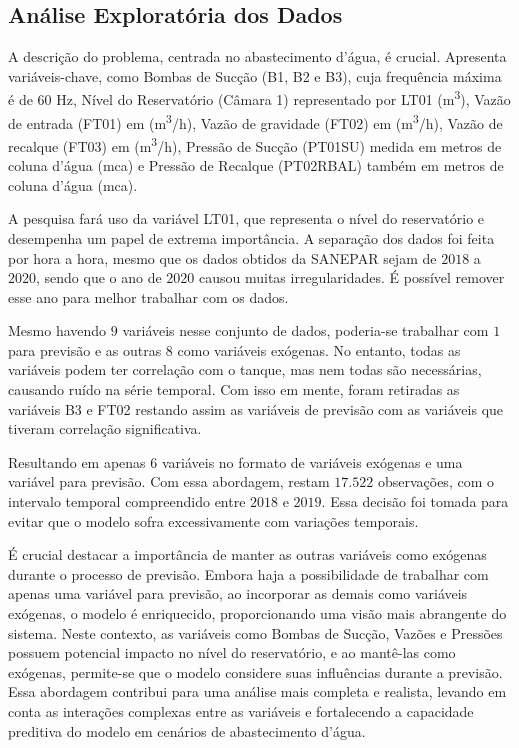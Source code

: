 \subsection{An\'alise Explorat\'oria dos Dados}


A descrição do problema, centrada no abastecimento d'água, é crucial. Apresenta variáveis-chave, como Bombas de Sucção (B1, B2 e B3), cuja frequência máxima é de $60$ Hz, Nível do Reservatório (Câmara 1) representado por LT01 (\si{m^3}), Vazão de entrada (FT01) em (\si{m^3/h}), Vazão de gravidade (FT02) em (\si{m^3/h}), Vazão de recalque (FT03) em (\si{m^3/h}), Pressão de Sucção (PT01SU) medida em metros de coluna d'água (\si{mca}) e Pressão de Recalque (PT02RBAL) também em metros de coluna d'água (\si{mca}).

A pesquisa fará uso da variável LT01, que representa o nível do reservatório e desempenha um papel de extrema importância. A separação dos dados foi feita por hora a hora, mesmo que os dados obtidos da SANEPAR sejam de $2018$ a $2020$, sendo que o ano de $2020$ causou muitas irregularidades. É possível remover esse ano para melhor trabalhar com os dados.

Mesmo havendo $9$ variáveis nesse conjunto de dados, poderia-se trabalhar com $1$ para previsão e as outras 8 como variáveis exógenas. No entanto, todas as variáveis podem ter correlação com o tanque, mas nem todas são necessárias, causando ruído na série temporal. Com isso em mente, foram retiradas as variáveis B3 e FT02 restando assim as variáveis de previsão com as variáveis que tiveram correlação significativa.

Resultando em apenas 6 variáveis no formato de variáveis exógenas e uma variável para previsão. Com essa abordagem, restam $17.522$ observações, com o intervalo temporal compreendido entre $2018$ e $2019$. Essa decisão foi tomada para evitar que o modelo sofra excessivamente com variações temporais.

É crucial destacar a importância de manter as outras variáveis como exógenas durante o processo de previsão. Embora haja a possibilidade de trabalhar com apenas uma variável para previsão, ao incorporar as demais como variáveis exógenas, o modelo é enriquecido, proporcionando uma visão mais abrangente do sistema. Neste contexto, as variáveis como Bombas de Sucção, Vazões e Pressões possuem potencial impacto no nível do reservatório, e ao mantê-las como exógenas, permite-se que o modelo considere suas influências durante a previsão. Essa abordagem contribui para uma análise mais completa e realista, levando em conta as interações complexas entre as variáveis e fortalecendo a capacidade preditiva do modelo em cenários de abastecimento d'água.

